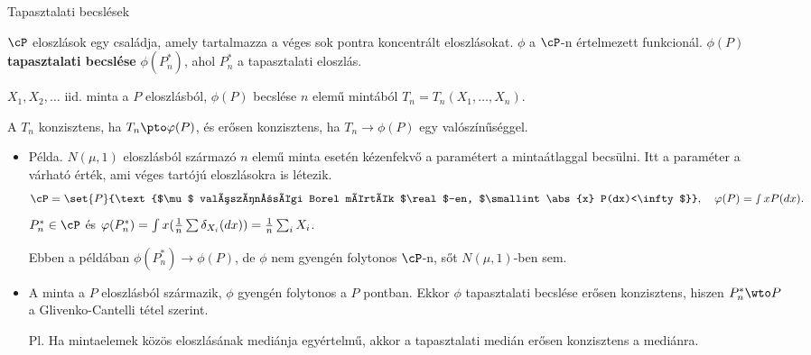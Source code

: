 \documentclass[aspectratio=169,notheorems,9pt,\option]{beamer}
\begin{document}
\begin{frame}{Tapasztalati becslések}
  \begin{df}
    $\cP$ eloszlások egy családja, amely tartalmazza a véges sok
    pontra koncentrált eloszlásokat. $\phi$ a $\cP$-n értelmezett
    funkcionál.
    $\phi (P)$ \textbf{tapasztalati becslése} $\phi (P_n^*)$, ahol $P_n^*$ a
    tapasztalati eloszlás. 
  \end{df}

  \begin{df}
    $X_1,X_2,\dots$ iid. minta a $P$ eloszlásból,
    $\phi(P)$ becslése $n$ elemű mintából $T_n=T_n (X_1,\dots,X_n)$.

    A $T_n$ %
    konzisztens, ha $T_n\pto\phi(P)$, és erősen
    konzisztens, ha $T_n\to\phi(P)$ egy valószínűséggel.
  \end{df}

  \begin{itemize}
  \item Példa. $N (\mu,1)$ eloszlásból származó $n$ elemű minta esetén kézenfekvő a paramétert a
    mintaátlaggal becsülni. 
    Itt a paraméter a várható érték, ami véges tartójú eloszlásokra is
    létezik. %
    \begin{displaymath}
      \cP=\set{P}{\text{$\mu$ valószínűségi Borel mérték $\real$-en, 
      $\smallint \abs{x} P(dx)<\infty$}},\quad \phi(P)=\smallint x P(d x). 
    \end{displaymath}
    $P_n^*\in\cP$ és $\varphi(P_n^*)=\int x (\frac1n\sum \delta_{X_i}(d x))=\frac1n\sum_i X_i$.

    Ebben a példában $\phi(P_n^*)\to\phi(P)$, de $\phi$ nem gyengén folytonos $\cP$-n,
    sőt $N(\mu,1)$-ben sem.

  \item A minta a $P$ eloszlásból származik, $\phi$ gyengén folytonos a $P$ pontban. 
    Ekkor $\phi$ tapasztalati becslése erősen
    konzisztens, hiszen $P_n^*\wto P$ a Glivenko-Cantelli tétel szerint.
    
    Pl. Ha mintaelemek közös eloszlásának mediánja egyértelmű, akkor 
    a tapasztalati medián erősen konzisztens a mediánra.
  \end{itemize}
  
\end{frame}
\end{document}
